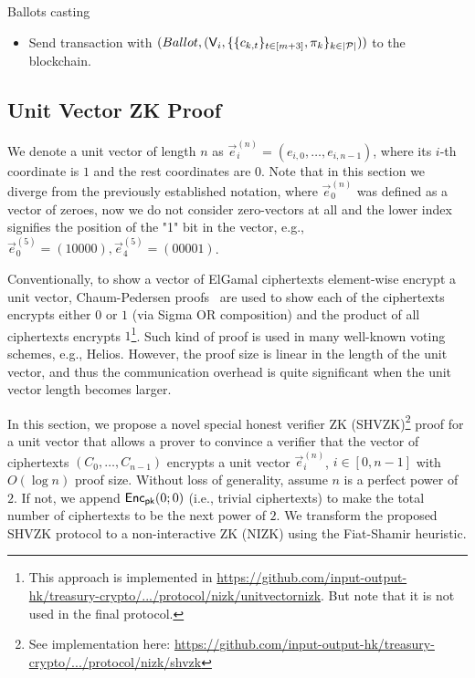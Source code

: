 \begin{boxfig}{\label{fig:vote}Ballots casting}{}
\begin{itemize}
\begin{itemize}
\begin{itemize}
			    \item pick randomness $r_{k,1},\ldots, r_{k,m+3}\leftarrow \ZZ_q$ and compute $u_{k,t}\leftarrow \Enc_{\pk}(e^{(m+3)}_{k,t}; r_{k,t})$, $t\in[m+3]$;
			    \item produce a unit vector proof $\pi_k$ showing that $\{c_{k,t}\}_{t\in[m+3]}$ encrypts a unit vector.
			\end{itemize}
			  
			\item Send transaction with $(Ballot, (\mathsf{V}_i, \{\{c_{k,t}\}_{t\in[m+3]}, \pi_k\}_{k \in |\mathcal{P}|}))$ to the blockchain.
		\end{itemize}	
	\end{itemize}
\end{boxfig}

\FloatBarrier
\subsection{Unit Vector ZK Proof}\label{sec:SHVZK}
We denote a unit vector of length $n$ as $\vec{e}_i^{(n)} = (e_{i,0},\ldots, e_{i,n-1})$,  where its $i$-th coordinate is $1$ and the rest coordinates are $0$. Note that in this section we diverge from the previously established notation, where $\vec{e}_0^{(n)}$ was defined as a vector of zeroes, now we do not consider zero-vectors at all and the lower index signifies the position of the "1" bit in the vector, e.g., $\vec{e}_0^{(5)}=(10000), \vec{e}_4^{(5)}=(00001)$.

Conventionally, to show a vector of ElGamal ciphertexts element-wise encrypt a unit vector, Chaum-Pedersen proofs~\cite{CP92} are used to show each of the ciphertexts encrypts either $0$ or $1$ (via Sigma OR composition) and the product of all ciphertexts encrypts $1$\footnote{This approach is implemented in \href{https://github.com/input-output-hk/treasury-crypto/tree/master/src/main/scala/io/iohk/protocol/nizk/unitvectornizk}{https://github.com/input-output-hk/treasury-crypto/.../protocol/nizk/unitvectornizk}. But note that it is not used in the final protocol.}. Such kind of proof is used in many well-known voting schemes, e.g., Helios. However, the proof size is linear in the length of the unit vector, and thus the communication overhead is quite significant when the unit vector length becomes larger. 

In this section, we propose a novel special honest verifier ZK  (SHVZK)\footnote{See implementation here: \href{https://github.com/input-output-hk/treasury-crypto/tree/master/src/main/scala/io/iohk/protocol/nizk/shvzk}{https://github.com/input-output-hk/treasury-crypto/.../protocol/nizk/shvzk}} proof for a unit vector that allows a prover to convince a verifier that the vector of ciphertexts $(C_0,\ldots, C_{n-1})$ encrypts a unit vector $\vec{e}_i^{(n)}$, $i\in[0, n-1]$ with $O(\log n)$  proof size. Without loss of generality, assume $n$ is a perfect power of $2$. If not, we append $\mathsf{Enc}_{\mathsf{pk}}(0;0)$ (i.e., trivial ciphertexts) to make the total number of ciphertexts to be the next power of $2$. We transform the proposed SHVZK protocol to a non-interactive ZK (NIZK) using the Fiat-Shamir heuristic.

